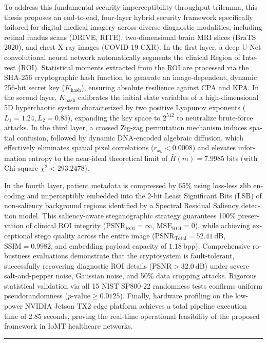 \begin{latin}


To address this fundamental security{-}imperceptibility{-}throughput trilemma, this thesis proposes an end{-}to{-}end, four{-}layer hybrid security framework specifically tailored for digital medical imagery across diverse diagnostic modalities, including retinal fundus scans (DRIVE, RITE), two{-}dimensional brain MRI slices (BraTS 2020), and chest X{-}ray images (COVID{-}19 CXR). In the first layer, a deep U{-}Net convolutional neural network automatically segments the clinical Region of Interest (ROI). Statistical moments extracted from the ROI are processed via the SHA{-}256 cryptographic hash function to generate an image{-}dependent, dynamic 256{-}bit secret key ($K_{\mathrm{hash}}$), ensuring absolute resilience against CPA and KPA. In the second layer, $K_{\mathrm{hash}}$ calibrates the initial state variables of a high{-}dimensional 5D hyperchaotic system characterized by two positive Lyapunov exponents ($L_1 = 1.24,\allowbreak{} L_2 = 0.85$), expanding the key space to $2^{512}$ to neutralize brute{-}force attacks. In the third layer, a crossed Zig{-}zag permutation mechanism induces spatial confusion, followed by dynamic DNA{-}encoded algebraic diffusion, which effectively eliminates spatial pixel correlations ($r_{xy} < 0.0008$) and elevates information entropy to the near{-}ideal theoretical limit of $\bar{H}(m) = 7.9985$ bits (with Chi{-}square $\chi^2 < 293.2478$).\par



In the fourth layer, patient metadata is compressed by 65\% using loss{-}less zlib encoding and imperceptibly embedded into the 2{-}bit Least Significant Bits (LSB) of non{-}saliency background regions identified by a Spectral Residual Saliency detection model. This saliency{-}aware steganographic strategy guarantees 100\% preservation of clinical ROI integrity ($\mathrm{PSNR}_{\mathrm{ROI}} = \infty$, $\mathrm{MSE}_{\mathrm{ROI}} = 0$), while achieving exceptional stego quality across the entire image ($\mathrm{PSNR}_{\mathrm{Total}} = 52.41\mathrm{~dB}$, $\mathrm{SSIM} = 0.9982$, and embedding payload capacity of $1.18\mathrm{~bpp}$). Comprehensive robustness evaluations demonstrate that the cryptosystem is fault{-}tolerant, successfully recovering diagnostic ROI details ($\mathrm{PSNR} > 32.0\mathrm{~dB}$) under severe salt{-}and{-}pepper noise, Gaussian noise, and 50\% data cropping attacks. Rigorous statistical validation via all 15 NIST SP800{-}22 randomness tests confirms uniform pseudorandomness ($p\text{-value} \ge 0.0125$). Finally, hardware profiling on the low{-}power NVIDIA Jetson TX2 edge platform achieves a total pipeline execution time of 2.85 seconds, proving the real{-}time operational feasibility of the proposed framework in IoMT healthcare networks.\par





\par\medskip\hrule\medskip

\end{latin}
